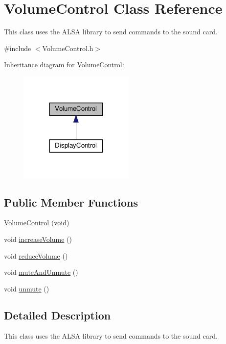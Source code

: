 \hypertarget{classVolumeControl}{}\section{Volume\+Control Class Reference}
\label{classVolumeControl}


This class uses the A\+L\+SA library to send commands to the sound card.  




{\ttfamily \#include $<$Volume\+Control.\+h$>$}



Inheritance diagram for Volume\+Control\+:\nopagebreak
\begin{figure}[H]
\begin{center}
\leavevmode
\includegraphics[width=161pt]{classVolumeControl__inherit__graph}
\end{center}
\end{figure}
\subsection*{Public Member Functions}
\begin{DoxyCompactItemize}
\item 
\hyperlink{classVolumeControl_a3cc73bb232bd87f8385da0440126c38c}{Volume\+Control} (void)
\item 
void \hyperlink{classVolumeControl_a6b51293368c1740b9bee0b8a4e7ed421}{increase\+Volume} ()
\item 
void \hyperlink{classVolumeControl_ad8e3e3740268388e906984fa807761a1}{reduce\+Volume} ()
\item 
void \hyperlink{classVolumeControl_a77273bc06d0f25068045860b0c6b4f91}{mute\+And\+Unmute} ()
\item 
void \hyperlink{classVolumeControl_a4a541c510e22cd07b206ca80f979c1a1}{unmute} ()
\end{DoxyCompactItemize}


\subsection{Detailed Description}
This class uses the A\+L\+SA library to send commands to the sound card. 

